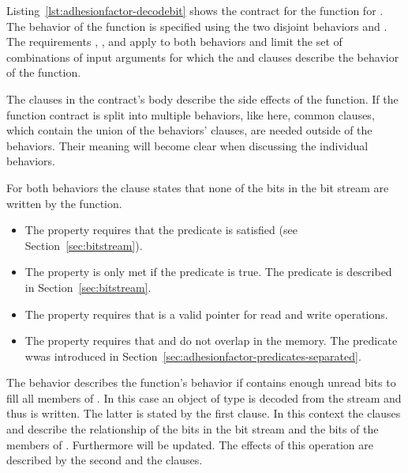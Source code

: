Listing~\ref{lst:adhesionfactor-decodebit} shows the contract
for the  function for .
The behavior of the function is specified using the
two disjoint behaviors  and .
The requirements , ,
 and  apply to both behaviors
and limit the set of combinations of input arguments for which the
 and  clauses describe the behavior
of the function.

The  clauses in the contract's body describe the
side effects of the function.
If the function contract is split into multiple behaviors,
like here, common  clauses, which contain the union
of the behaviors'  clauses, are needed outside
of the behaviors.
Their meaning will become clear when discussing the
individual  behaviors.

For both behaviors the  clause states that
none of the bits in the bit stream are written by the function.

\begin{itemize}
\item
The property  requires that the predicate 
is satisfied (see Section~\ref{sec:bitstream}).

\item
The property  is only met if the  predicate is true.
The predicate  is described in
Section~\ref{sec:bitstream}.

\item
The property  requires that  is a valid pointer for read and write operations.

\item
The property  requires that  and  do not overlap in the memory.
The 
predicate wwas introduced in
Section~\ref{sec:adhesionfactor-predicates-separated}.
\end{itemize}



The behavior  describes the function's behavior if
 contains enough unread bits to fill
all members of . 
In this case an object of type 
is decoded from the stream
and thus  is written.
The latter is stated by the first  clause.
In this context the  clauses  and 
describe the relationship of the bits in the bit stream and
the bits of the members of .
Furthermore  will be updated.
The effects of this operation are described by the second
 and the  clauses.

